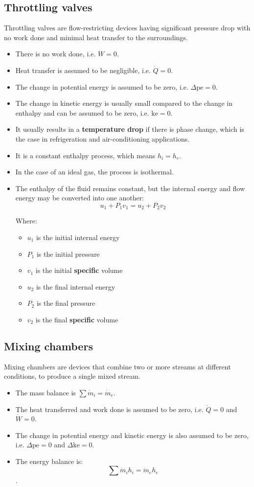 \documentclass[11pt]{article}
\begin{document}
\subsection{Throttling valves}
\label{sec:org777d8ff}
Throttling valves are flow-restricting devices having significant pressure drop with no work done and minimal heat transfer to the surroundings.
\begin{itemize}
\item There is no work done, i.e. \(\dot{W} = 0\).
\item Heat transfer is assumed to be negligible, i.e. \(\dot{Q} = 0\).
\item The change in potential energy is assumed to be zero, i.e. \(\Delta \text{pe} = 0\).
\item The change in kinetic energy is usually small compared to the change in enthalpy and can be assumed to be zero, i.e. \(\text{ke} = 0\).
\item It usually results in a \textbf{temperature drop} if there is phase change, which is the case in refrigeration and air-conditioning applications.
\item It is a constant enthalpy process, which means \(h_i = h_e\).
\item In the case of an ideal gas, the process is isothermal.
\item The enthalpy of the fluid remains constant, but the internal energy and flow energy may be converted into one another:
\[u_1 + P_1 v_1 = u_2 + P_2 v_2\]

Where:
\begin{itemize}
\item \(u_1\) is the initial internal energy
\item \(P_1\) is the initial pressure
\item \(v_1\) is the initial \textbf{specific} volume
\item \(u_2\) is the final internal energy
\item \(P_2\) is the final pressure
\item \(v_2\) is the final \textbf{specific} volume
\end{itemize}
\end{itemize}

\newpage

\subsection{Mixing chambers}
\label{sec:orgcbc1f6a}
Mixing chambers are devices that combine two or more streams at different conditions, to produce a single mixed stream.
\begin{itemize}
\item The mass balance is \(\sum \dot{m}_i = \dot{m}_e\).
\item The heat transferred and work done is assumed to be zero, i.e. \(\dot{Q} = 0\) and \(\dot{W} = 0\).
\item The change in potential energy and kinetic energy is also assumed to be zero, i.e. \(\Delta \text{pe} = 0\) and \(\Delta \text{ke} = 0\).
\item The energy balance is:
\[\sum \dot{m}_i h_i = \dot{m}_e h_e\].
\end{itemize}
\end{document}
